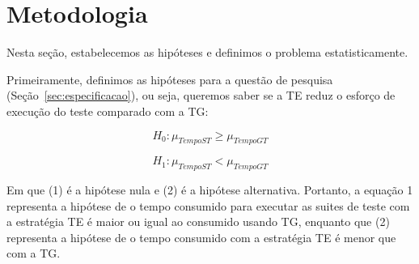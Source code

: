 \section{Metodologia}
\label{sec:metodologia}




Nesta seção, estabelecemos as hipóteses e definimos o problema estatisticamente.

Primeiramente, definimos as hipóteses para a questão de pesquisa (Seção~\ref{sec:especificacao}), ou seja, queremos saber se a TE reduz o esforço de execução do teste comparado com a TG:

\begin{equation}
	H_{0} : \mu_{TempoST} \geq \mu_{TempoGT}
\end{equation}

\begin{equation}
	H_{1} : \mu_{TempoST} < \mu_{TempoGT}
\end{equation}

Em que (1) é a hipótese nula e (2) é a hipótese alternativa. Portanto, a equação 1 representa a hipótese de o tempo consumido para executar as suites de teste com a estratégia TE é maior ou igual ao consumido usando TG, enquanto que (2) representa a hipótese de o tempo consumido com a estratégia TE é menor que com a TG.




